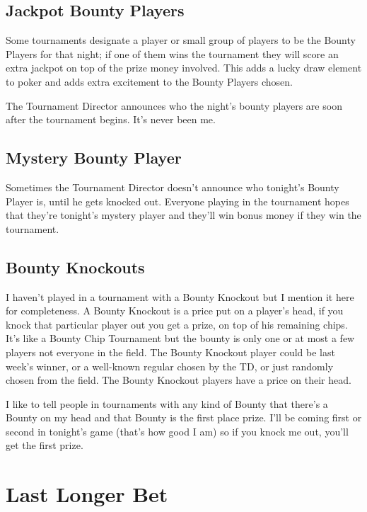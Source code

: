 \subsection{Jackpot Bounty Players}

Some tournaments designate a player or small group of players
to be the Bounty Players for that night; if one of them wins
the tournament they will score an extra jackpot on top of
the prize money involved. This adds a lucky draw element to
poker and adds extra excitement to the Bounty Players chosen.

The Tournament Director announces who the night's bounty players
are soon after the tournament begins. It's never been me.

\subsection{Mystery Bounty Player}

Sometimes the Tournament Director doesn't announce who tonight's
Bounty Player is, until he gets knocked out. Everyone playing in the
tournament hopes that they're tonight's mystery player and they'll
win bonus money if they win the tournament.

\subsection{Bounty Knockouts}

I haven't played in a tournament with a Bounty Knockout but I
mention it here for completeness. A Bounty Knockout is a price
put on a player's head, if you knock that particular player out
you get a prize, on top of his remaining chips. It's like a
Bounty Chip Tournament but the bounty is only one or at most
a few players not everyone in the field. The Bounty Knockout player
could be last week's winner, or a well-known regular chosen
by the TD, or just randomly chosen from the field. The Bounty Knockout
players have a price on their head.

I like to tell people in tournaments with any kind of Bounty
that there's a Bounty on my head and that Bounty is the first
place prize. I'll be coming first or second in tonight's game (that's
how good I am) so if you knock me out, you'll get the first prize.

\section{Last Longer Bet}

